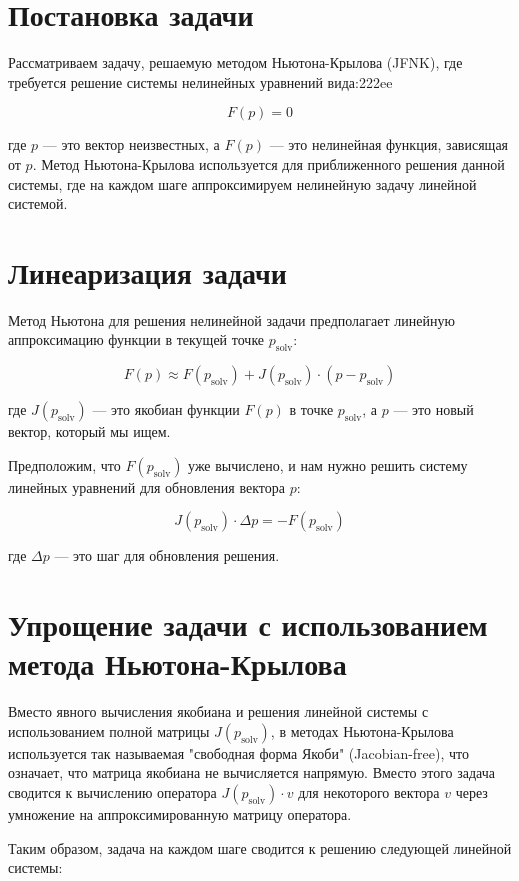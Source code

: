 \documentclass[12pt]{amsart}
\begin{document}
\section{Постановка задачи}

Рассматриваем задачу, решаемую методом Ньютона-Крылова (JFNK), где требуется решение системы нелинейных уравнений вида:222ee

\[
F(p) = 0
\]

где \( p \) — это вектор неизвестных, а \( F(p) \) — это нелинейная функция, зависящая от \( p \). Метод Ньютона-Крылова используется для приближенного решения данной системы, где на каждом шаге аппроксимируем нелинейную задачу линейной системой.

\section{Линеаризация задачи}

Метод Ньютона для решения нелинейной задачи предполагает линейную аппроксимацию функции в текущей точке \( p_{\text{solv}} \):

\[
F(p) \approx F(p_{\text{solv}}) + J(p_{\text{solv}}) \cdot (p - p_{\text{solv}})
\]

где \( J(p_{\text{solv}}) \) — это якобиан функции \( F(p) \) в точке \( p_{\text{solv}} \), а \( p \) — это новый вектор, который мы ищем.

Предположим, что \( F(p_{\text{solv}}) \) уже вычислено, и нам нужно решить систему линейных уравнений для обновления вектора \( p \):

\[
J(p_{\text{solv}}) \cdot \Delta p = -F(p_{\text{solv}})
\]

где \( \Delta p \) — это шаг для обновления решения.

\section{Упрощение задачи с использованием метода Ньютона-Крылова}

Вместо явного вычисления якобиана и решения линейной системы с использованием полной матрицы \( J(p_{\text{solv}}) \), в методах Ньютона-Крылова используется так называемая "свободная форма Якоби" (Jacobian-free), что означает, что матрица якобиана не вычисляется напрямую. Вместо этого задача сводится к вычислению оператора \( J(p_{\text{solv}}) \cdot v \) для некоторого вектора \( v \) через умножение на аппроксимированную матрицу оператора.

Таким образом, задача на каждом шаге сводится к решению следующей линейной системы:
\end{document}

